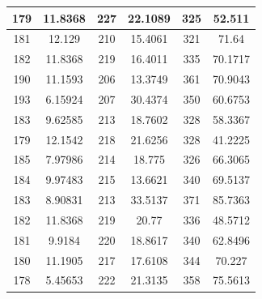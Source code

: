 \documentclass{article}
\begin{document}
\begin{tabular}{cccccc}
179&11.8368&227&22.1089&325&52.511 \\ \hline
181&12.129&210&15.4061&321&71.64 \\ \hline
182&11.8368&219&16.4011&335&70.1717 \\ \hline
190&11.1593&206&13.3749&361&70.9043 \\ \hline
193&6.15924&207&30.4374&350&60.6753 \\ \hline
183&9.62585&213&18.7602&328&58.3367 \\ \hline
179&12.1542&218&21.6256&328&41.2225 \\ \hline
185&7.97986&214&18.775&326&66.3065 \\ \hline
184&9.97483&215&13.6621&340&69.5137 \\ \hline
183&8.90831&213&33.5137&371&85.7363 \\ \hline
182&11.8368&219&20.77&336&48.5712 \\ \hline
181&9.9184&220&18.8617&340&62.8496 \\ \hline
180&11.1905&217&17.6108&344&70.227 \\ \hline
178&5.45653&222&21.3135&358&75.5613 \\ \hline
\end{tabular}
\end{document}
